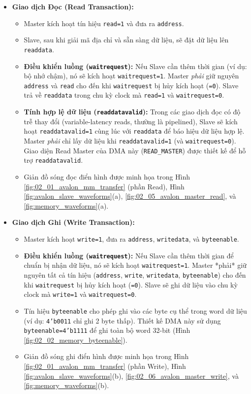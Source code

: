 \begin{itemize}
    \item \textbf{Giao dịch Đọc (Read Transaction):}
        \begin{itemize}
            \item Master kích hoạt tín hiệu \texttt{read=1} và đưa ra \texttt{address}.
            \item Slave, sau khi giải mã địa chỉ và sẵn sàng dữ liệu, sẽ đặt dữ liệu lên \texttt{readdata}.
            \item \textbf{Điều khiển luồng (\texttt{waitrequest}):} Nếu Slave cần thêm thời gian (ví dụ: bộ nhớ chậm), nó sẽ kích hoạt \texttt{waitrequest=1}. Master \textit{phải} giữ nguyên \texttt{address} và \texttt{read} cho đến khi \texttt{waitrequest} bị hủy kích hoạt (\texttt{=0}). Slave trả về \texttt{readdata} trong chu kỳ clock mà \texttt{read=1} và \texttt{waitrequest=0}.
            \item \textbf{Tính hợp lệ dữ liệu (\texttt{readdatavalid}):} Trong các giao dịch đọc có độ trễ thay đổi (variable-latency reads, thường là pipelined), Slave sẽ kích hoạt \texttt{readdatavalid=1} cùng lúc với \texttt{readdata} để báo hiệu dữ liệu hợp lệ. Master \textit{phải} chỉ lấy dữ liệu khi \texttt{readdatavalid=1} (và \texttt{waitrequest=0}). Giao diện Read Master của DMA này (\texttt{READ\_MASTER}) được thiết kế để hỗ trợ \texttt{readdatavalid}.
            \item Giản đồ sóng đọc điển hình được minh họa trong Hình \ref{fig:02_01_avalon_mm_transfer} (phần Read), Hình \ref{fig:avalon_slave_waveforms}(a), \ref{fig:02_05_avalon_master_read}, và \ref{fig:memory_waveforms}(a).
        \end{itemize}
    \item \textbf{Giao dịch Ghi (Write Transaction):}
        \begin{itemize}
            \item Master kích hoạt \texttt{write=1}, đưa ra \texttt{address}, \texttt{writedata}, và \texttt{byteenable}.
            \item \textbf{Điều khiển luồng (\texttt{waitrequest}):} Nếu Slave cần thêm thời gian để chuẩn bị nhận dữ liệu, nó sẽ kích hoạt \texttt{waitrequest=1}. Master *phải* giữ nguyên tất cả tín hiệu (\texttt{address}, \texttt{write}, \texttt{writedata}, \texttt{byteenable}) cho đến khi \texttt{waitrequest} bị hủy kích hoạt (\texttt{=0}). Slave sẽ ghi dữ liệu vào chu kỳ clock mà \texttt{write=1} và \texttt{waitrequest=0}.
            \item Tín hiệu \texttt{byteenable} cho phép ghi vào các byte cụ thể trong word dữ liệu (ví dụ: \texttt{4'b0011} chỉ ghi 2 byte thấp). Thiết kế DMA này sử dụng \texttt{byteenable=4'b1111} để ghi toàn bộ word 32-bit (Hình \ref{fig:02_02_memory_byteenable}).
            \item Giản đồ sóng ghi điển hình được minh họa trong Hình \ref{fig:02_01_avalon_mm_transfer} (phần Write), Hình \ref{fig:avalon_slave_waveforms}(b), \ref{fig:02_06_avalon_master_write}, và \ref{fig:memory_waveforms}(b).
        \end{itemize}
\end{itemize}

